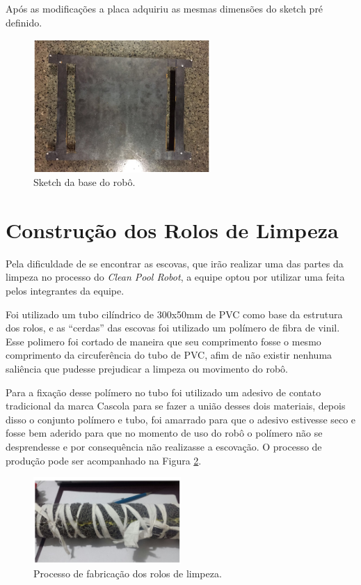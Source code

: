 Após as modificações a placa adquiriu as mesmas dimensões do sketch pré definido.

\par
\begin{figure}[h]
  \centering
  \includegraphics[width=0.6\textwidth]{figures/sketch-base.png}
  \caption{Sketch da base do robô.}
  \label{fig:sketch-base}
\end{figure}
\FloatBarrier
\par

\section{Construção dos Rolos de Limpeza}
Pela dificuldade de se encontrar as escovas, que irão realizar uma das partes da limpeza no processo do \textit{Clean Pool Robot}, a equipe optou por utilizar uma feita pelos integrantes da equipe.

Foi utilizado um tubo cilíndrico de 300x50mm de PVC como base da estrutura dos rolos, e as “cerdas” das escovas foi  utilizado um polímero de fibra de vinil. Esse polimero foi cortado de maneira que seu comprimento fosse o mesmo comprimento da circuferência do tubo de PVC, afim de não existir nenhuma saliência que pudesse prejudicar a limpeza ou movimento do robô.

Para a fixação desse polímero no tubo foi utilizado um adesivo de contato tradicional da marca Cascola para se fazer a união desses dois materiais, depois disso o conjunto polímero e tubo, foi amarrado para que o adesivo estivesse seco e fosse bem aderido para que no momento de uso do robô o polímero não se desprendesse e por consequência não realizasse a escovação. O processo de produção pode ser acompanhado na Figura \ref{fig:rolo}.

\par
\begin{figure}[h]
  \centering
  \includegraphics[width=0.5\textwidth]{figures/rolo.png}
  \caption{Processo de fabricação dos rolos de limpeza.}
  \label{fig:rolo}
\end{figure}
\FloatBarrier
\par

